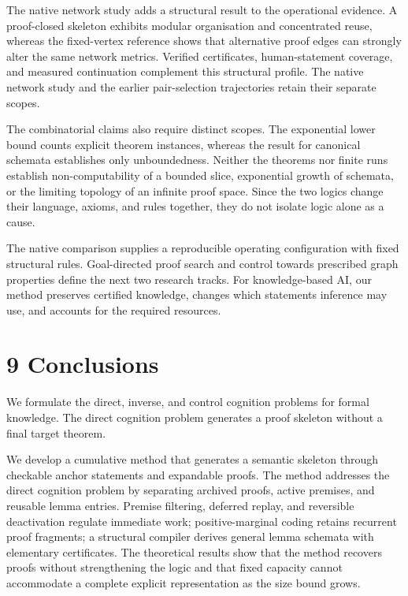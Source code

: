 \documentclass[pdflatex,sn-basic,Numbered]{sn-jnl}
\begin{document}
The native network study adds a structural result to the operational evidence. A proof-closed skeleton exhibits modular organisation and concentrated reuse, whereas the fixed-vertex reference shows that alternative proof edges can strongly alter the same network metrics. Verified certificates, human-statement coverage, and measured continuation complement this structural profile. The native network study and the earlier pair-selection trajectories retain their separate scopes.

The combinatorial claims also require distinct scopes. The exponential lower bound counts explicit theorem instances, whereas the result for canonical schemata establishes only unboundedness. Neither the theorems nor finite runs establish non-computability of a bounded slice, exponential growth of schemata, or the limiting topology of an infinite proof space. Since the two logics change their language, axioms, and rules together, they do not isolate logic alone as a cause.

The native comparison supplies a reproducible operating configuration with fixed structural rules. Goal-directed proof search and control towards prescribed graph properties define the next two research tracks. For knowledge-based AI, our method preserves certified knowledge, changes which statements inference may use, and accounts for the required resources.

\section*{9 Conclusions}\label{conclusions}

We formulate the direct, inverse, and control cognition problems for formal knowledge. The direct cognition problem generates a proof skeleton without a final target theorem. 

We develop a cumulative method that generates a semantic skeleton through checkable anchor statements and expandable proofs. The method addresses the direct cognition problem by separating archived proofs, active premises, and reusable lemma entries. Premise filtering, deferred replay, and reversible deactivation regulate immediate work; positive-marginal coding retains recurrent proof fragments; a structural compiler derives general lemma schemata with elementary certificates. The theoretical results show that the method recovers proofs without strengthening the logic and that fixed capacity cannot accommodate a complete explicit representation as the size bound grows.
\end{document}
